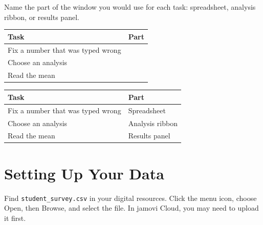 
\begin{Exercise}[title={Which Part of the Window?}, label={ex:jamovi-regions}]
Name the part of the window you would use for each task: spreadsheet, analysis ribbon, or results panel.

\begin{center}
\begin{tabular}{|p{8cm}|p{4cm}|}
\hline
Task & Part \\
\hline
Fix a number that was typed wrong & \\
\hline
Choose an analysis & \\
\hline
Read the mean & \\
\hline
\end{tabular}
\end{center}
\end{Exercise}
\begin{Answer}[ref={ex:jamovi-regions}]
\begin{center}
\begin{tabular}{|p{8cm}|p{4cm}|}
\hline
Task & Part \\
\hline
Fix a number that was typed wrong & Spreadsheet \\
\hline
Choose an analysis & Analysis ribbon \\
\hline
Read the mean & Results panel \\
\hline
\end{tabular}
\end{center}
\end{Answer}

\section{Setting Up Your Data}

Find \texttt{student\_survey.csv} in your digital resources. Click the menu icon, choose Open, then Browse, and select the file. In jamovi Cloud, you may need to upload it first.


